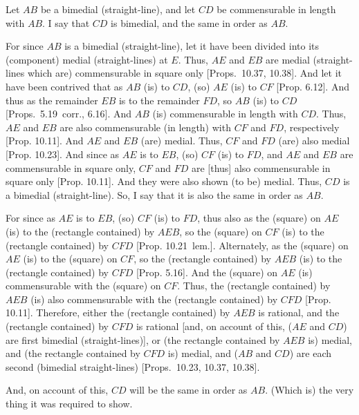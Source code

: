 \begin{Parallel}{}{}
{\epsfysize=0.7in 
\centerline{}
 
Let $AB$ be a bimedial (straight-line), and let $CD$ be commensurable
in length with $AB$. I say that $CD$ is bimedial, and the same in order as
$AB$.

For since $AB$ is a bimedial (straight-line), let it have been divided into its
(component) medial (straight-lines) at $E$. Thus, $AE$ and $EB$
are medial (straight-lines which are) commensurable in square only [Props.~10.37, 10.38]. And
let it have been contrived that as $AB$ (is) to $CD$, (so) $AE$ (is)
to $CF$ [Prop. 6.12]. And thus as the remainder $EB$ is to the remainder $FD$, so $AB$ (is) to $CD$ [Props.~5.19~corr., 6.16].
And $AB$ (is) commensurable in length with $CD$. Thus, $AE$
and $EB$ are also commensurable (in length) with $CF$ and $FD$, respectively [Prop. 10.11]. And 
$AE$ and $EB$ (are) medial. Thus, $CF$ and $FD$ (are) also
medial [Prop. 10.23]. And since as $AE$
is to $EB$, (so) $CF$ (is) to $FD$, and $AE$ and $EB$ are commensurable
in square only, $CF$ and $FD$ are [thus] also commensurable in square only
[Prop. 10.11]. And they were also shown (to be)
medial. Thus, $CD$ is a bimedial (straight-line). So, I say that it is also the same in order as $AB$.

For since as $AE$ is to $EB$, (so) $CF$ (is) to $FD$, thus also as the
(square) on $AE$ (is) to the (rectangle contained) by $AEB$, so the (square)
on $CF$ (is) to the (rectangle contained) by $CFD$ [Prop. 10.21~lem.]. Alternately, as the (square)
on $AE$ (is) to the (square) on $CF$, so the (rectangle
contained) by $AEB$ (is) to the (rectangle contained) by $CFD$ [Prop. 5.16]. And the (square) on $AE$
(is) commensurable with the (square) on $CF$. Thus, the (rectangle
contained) by $AEB$ (is) also commensurable with the (rectangle contained)
by $CFD$ [Prop. 10.11]. Therefore,  either the
(rectangle contained) by $AEB$ is rational, and  the (rectangle contained) by
$CFD$ is rational [and, on account of this, ($AE$ and $CD$) are first
bimedial (straight-lines)], or (the rectangle contained by $AEB$ is) medial,
and (the rectangle contained by $CFD$ is) medial, and ($AB$ and
$CD$) are each second (bimedial straight-lines) [Props.~10.23, 10.37, 10.38].

And, on account of this, $CD$ will be  the same in order as $AB$.
(Which is) the very thing it was required to show.}
\end{Parallel}

